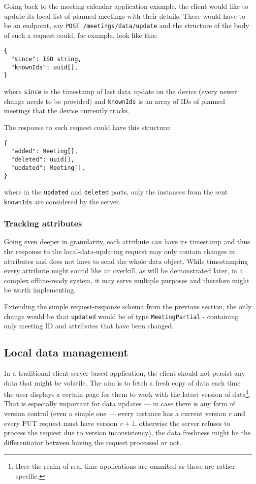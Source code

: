 \documentclass[
  digital,     %
  color,       %
  oneside,     %
  nosansbold,  %
  nocolorbold, %
  lof,         %
  lot,         %
]{fithesis4}
\begin{document}
Going back to the meeting calendar application example, the client would like to update its local list of planned meetings with their details. There would have to be an endpoint, say \texttt{POST /meetings/data/update} and the structure of the body of such a request could, for example, look like this: 

\begin{lstlisting}
{
  "since": ISO string,
  "knownIds": uuid[],
}

\end{lstlisting}
where \texttt{since} is the timestamp of last data update on the device (every newer change needs to be provided) and \texttt{knownIds} is an array of IDs of planned meetings that the device currently tracks.

The response to such request could have this structure:
\begin{lstlisting}
{
  "added": Meeting[],
  "deleted": uuid[],
  "updated": Meeting[],
}

\end{lstlisting}

where in the \texttt{updated} and \texttt{deleted} parts, only the instances from the sent \texttt{knownIds} are considered by the server.

\subsubsection{Tracking attributes}
Going even deeper in granularity, each attribute can have its timestamp and thus the response to the local-data-updating request may only contain changes in attributes and does not have to send the whole data object. While timestamping every attribute might sound like an overkill, as will be demonstrated later, in a complex offline-ready system, it may serve multiple purposes and therefore might be worth implementing.

Extending the simple request-response schema from the previous section, the only change would be that \texttt{updated} would be of type \texttt{MeetingPartial} - containing only meeting ID and attributes that have been changed.

\subsection{Local data management}
In a traditional client-server based application, the client should not persist any data that might be volatile. The aim is to fetch a fresh copy of data each time the user displays a certain page for them to work with the latest version of data\footnote{Here the realm of real-time applications are ommited as those are rather specific.}. That is especially important for data updates --- in case there is any form of version control (even a simple one --- every instance has a current version $v$ and every PUT request must have version $v + 1$, otherwise the server refuses to process the request due to version inconsistency), the data freshness might be the differentiator between having the request processed or not. 
\end{document}
